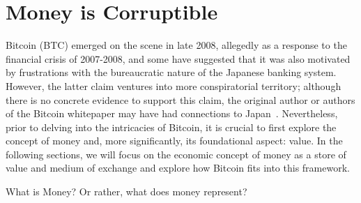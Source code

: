 \section{Money is Corruptible}
Bitcoin (BTC) emerged on the scene in late 2008, allegedly as a response to the financial crisis of 2007-2008, and some have suggested that it was also motivated by frustrations with the bureaucratic nature of the Japanese banking system. However, the latter claim ventures into more conspiratorial territory; although there is no concrete evidence to support this claim, the original author or authors of the Bitcoin whitepaper may have had connections to Japan~\cite{nakamoto2008bitcoin}.
Nevertheless, prior to delving into the intricacies of Bitcoin, it is crucial to first explore the concept of money and, more significantly, its foundational aspect: value. In the following sections, we will focus on the economic concept of money as a store of value and medium of exchange and explore how Bitcoin fits into this framework.

What is Money? Or rather, what does money represent?



